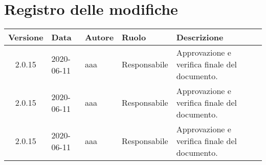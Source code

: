 \section*{Registro delle modifiche}
\setcounter{table}{-1}
{


\centering
\renewcommand{\arraystretch}{1.5}
\begin{longtable}{c C{2.5cm} C{2.5cm} C{3.5cm} C{3.5cm}}
\textbf{Versione} &
\textbf{Data}&
\textbf{Autore}&
\textbf{Ruolo}&
\textbf{Descrizione}\\
\endhead

2.0.15 & 2020-06-11 & aaa & Responsabile & Approvazione e verifica finale del documento. \\
2.0.15 & 2020-06-11 & aaa & Responsabile & Approvazione e verifica finale del documento. \\
2.0.15 & 2020-06-11 & aaa & Responsabile & Approvazione e verifica finale del documento. \\

		
\end{longtable}
}